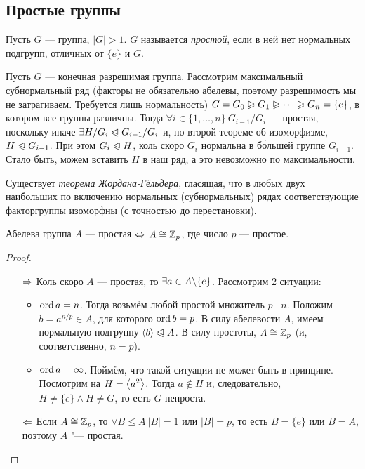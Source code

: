 \subsection{Простые группы}

\begin{definition}
	Пусть $G$ --- группа, $|G| > 1$. $G$ называется \textit{простой}, если в ней нет нормальных подгрупп, отличных от $\{e\}$ и $G$.
\end{definition}

\begin{note}
	Пусть $G$ --- конечная разрешимая группа. Рассмотрим максимальный субнормальный ряд (факторы не обязательно абелевы, поэтому разрешимость мы не затрагиваем. Требуется лишь нормальность) $G = G_0 \trianglerighteqslant G_1 \trianglerighteqslant \dots \trianglerighteqslant G_n = \{e\}$, в котором все группы различны. Тогда $\forall i \in \{1, \ldots, n\}\ G_{i-1} / G_i$ --- простая, поскольку иначе $\exists H / G_i \trianglelefteqslant G_{i - 1} / G_i$ и, по второй теореме об изоморфизме, $H \trianglelefteqslant G_{i - 1}$. При этом $G_i \trianglelefteqslant H$, коль скоро $G_i$ нормальна в б\'{о}льшей группе $G_{i - 1}$. Стало быть, можем вставить $H$ в наш ряд, а это невозможно по максимальности.
\end{note}

\begin{note}
	Существует \textit{теорема Жордана-Гёльдера}, гласящая, что в любых двух наибольших по включению нормальных (субнормальных) рядах соответствующие факторгруппы изоморфны (с точностью до перестановки).
\end{note}

\begin{proposition}
	Абелева группа $A$ --- простая $\Leftrightarrow$ $A \cong \mathbb{Z}_p$, где число $p$ --- простое.
\end{proposition}

\begin{proof}~
	\begin{itemize}
		\item[$\Rightarrow$] Коль скоро $A$ --- простая, то $\exists a \in A \backslash \{e\}$. Рассмотрим 2 ситуации:
		\begin{itemize}
			\item $\operatorname{ord} a = n$. Тогда возьмём любой простой множитель $p \mid n$. Положим $b = a^{n / p} \in A$, для которого $\operatorname{ord} b = p$. В силу абелевости $A$, имеем нормальную подгруппу $\left\langle b\right\rangle \trianglelefteqslant A$. В силу простоты, $A \cong \mathbb{Z}_p$ (и, соответственно, $n = p$).
			
			\item $\operatorname{ord} a = \infty$. Поймём, что такой ситуации не может быть в принципе. Посмотрим на $H = \left\langle a^2\right\rangle$. Тогда $a \notin H$ и, следовательно, $H \neq \{e\} \wedge H \neq G$, то есть $G$ непроста.
		\end{itemize}
		
		\item[$\Leftarrow$] Если $A \cong \mathbb{Z}_p$, то $\forall B \le A\ |B| = 1$ или $|B| = p$, то есть $B = \{e\}$ или $B = A$, поэтому $A$ "--- простая.
	\end{itemize}
\end{proof}

